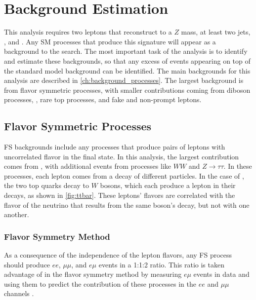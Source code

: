 
\chapter{Background Estimation} %
\label{ch:backgrounds} 

This analysis requires two leptons that reconstruct to a $Z$ mass, at least two jets, \met, and \HT. Any \ac{SM} processes that produce this signature will appear as a background to the search. The most important task of the analysis is to identify and estimate these backgrounds, so that any excess of events appearing on top of the standard model background can be identified. The main backgrounds for this analysis are described in \autoref{ch:background_processes}. The largest background is from flavor symmetric processes, with smaller contributions coming from diboson processes, \dyjets, rare top processes, and fake and non-prompt leptons.


\section{Flavor Symmetric Processes}
\label{sec:bg-fs}

\acf{FS} backgrounds include any processes that produce pairs of leptons with uncorrelated flavor in the final state. In this analysis, the largest contribution comes from \ttbar, with additional events from processes like $WW$ and $Z\rightarrow\tau\tau$. In these processes, each lepton comes from a decay of different particles. In the case of \ttbar, the two top quarks decay to $W$ bosons, which each produce a lepton in their decays, as shown in \autoref{fig:ttbar}. These leptons' flavors are correlated with the flavor of the neutrino that results from the same boson's decay, but not with one another. %

\subsection{Flavor Symmetry Method}
\label{sec:method-fs}
As a consequence of the independence of the lepton flavors, any \ac{FS} process should produce $ee$, $\mu\mu$, and $e\mu$ events in a 1:1:2 ratio. This ratio is taken advantage of in the flavor symmetry method by measuring $e\mu$ events in data and using them to predict the contribution of these processes in the $ee$ and $\mu\mu$ channels \cite{SUSY-2014-10}.

